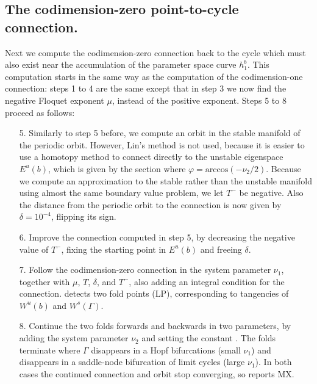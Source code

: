 \documentclass[12pt]{report}
\begin{document}
\subsection{The codimension-zero point-to-cycle connection.}
Next we compute the codimension-zero connection back to the cycle
which must also exist near the accumulation of the parameter space
curve $h_1^b$.
This computation starts in the same way as the computation of the
codimension-one connection: steps 1 to 4 are the same except that in
step 3 we now find the negative Floquet exponent $\mu$,
instead of the positive exponent. Steps 5 to 8 proceed as follows:
\begin{enumerate}
\item[5.]
Similarly to step 5 before, we compute an orbit in the stable manifold
of the periodic orbit. However, Lin's method is not used, because it
is easier to use a homotopy method to connect directly to the unstable
eigenspace $E^u(b)$, which is given by the section where
$\varphi=\mathrm{arccos}(-\nu_2/2)$.
Because we compute an approximation to the stable rather than the
unstable manifold using almost the same boundary value problem,
we let $T^-$ be negative. Also the distance from the periodic orbit
to the connection is now given by $\delta=10^{-4}$, flipping its sign.
\item[6.]
Improve the connection computed in step 5, by decreasing
the negative value of $T^-$, fixing the starting point in $E^u(b)$
and freeing $\delta$.
\item[7.]
Follow the codimension-zero connection in the system parameter
$\nu_1$, together with $\mu$, $T$, $\delta$, and $T^-$, also adding
an integral condition for the connection. \AUTO detects two fold
points (LP), corresponding to tangencies of $W^u(b)$ and $W^s(\Gamma)$.
\item[8.]
Continue the two folds forwards and backwards in two parameters,
by adding the system parameter $\nu_2$ and setting the \AUTO constant
. The folds terminate where $\Gamma$ disappears in a
Hopf bifurcations (small $\nu_1$) and disappears in a saddle-node bifurcation
of limit cycles (large $\nu_1$). In both cases the continued
connection and orbit stop converging, so \AUTO reports MX.
\end{enumerate}
\end{document}
